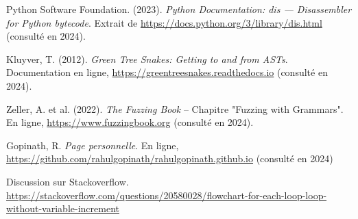 \documentclass[11pt,a4paper]{article}
\begin{document}
\begin{thebibliography}{99}
 Python Software Foundation. (2023). \textit{Python Documentation: dis --- Disassembler for Python bytecode}. Extrait de \url{https://docs.python.org/3/library/dis.html} (consulté en 2024).

 Kluyver, T. (2012). \textit{Green Tree Snakes: Getting to and from ASTs}. Documentation en ligne, \url{https://greentreesnakes.readthedocs.io} (consulté en 2024).

 Zeller, A. et al. (2022). \textit{The Fuzzing Book} – Chapitre "Fuzzing with Grammars". En ligne, \url{https://www.fuzzingbook.org} (consulté en 2024).

 Gopinath, R. \textit{Page personnelle}. En ligne, \url{https://github.com/rahulgopinath/rahulgopinath.github.io} (consulté en 2024)

 Discussion sur Stackoverflow. \url{https://stackoverflow.com/questions/20580028/flowchart-for-each-loop-loop-without-variable-increment}

\end{thebibliography}
\end{document}

